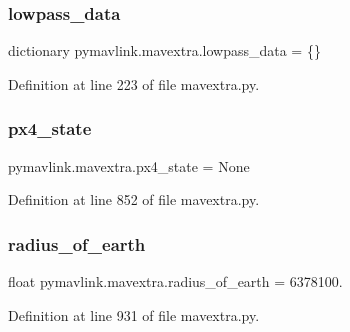 \subsubsection{\texorpdfstring{lowpass\_data}{lowpass\_data}}
{\footnotesize\ttfamily dictionary pymavlink.\+mavextra.\+lowpass\+\_\+data = \{\}}



Definition at line 223 of file mavextra.\+py.

\mbox{\label{namespacepymavlink_1_1mavextra_adf55d806751f41104a7c778b38c2d7e6}} 
\subsubsection{\texorpdfstring{px4\_state}{px4\_state}}
{\footnotesize\ttfamily pymavlink.\+mavextra.\+px4\+\_\+state = None}



Definition at line 852 of file mavextra.\+py.

\mbox{\label{namespacepymavlink_1_1mavextra_a0d623e5b8a6a2ee5f295e0d5c14fd01b}} 
\subsubsection{\texorpdfstring{radius\_of\_earth}{radius\_of\_earth}}
{\footnotesize\ttfamily float pymavlink.\+mavextra.\+radius\+\_\+of\+\_\+earth = 6378100.}



Definition at line 931 of file mavextra.\+py.


